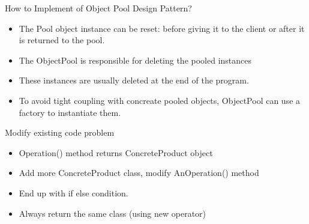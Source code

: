 \documentclass[13pt]{beamer}
\begin{document}
\begin{frame}{How to Implement of Object Pool Design Pattern?}
	\begin{itemize}
		\setlength\itemsep{1em}
		\item The Pool object instance can be reset: before giving it to the client or after it is returned to the pool.
		\item The ObjectPool is responsible for deleting the pooled instances
		\item These instances are usually deleted at the end of the program.
		\item To avoid tight coupling with concreate pooled objects, ObjectPool can use a factory to instantiate them.
	\end{itemize}
\end{frame}

\begin{frame}{Modify existing code problem}
	\begin{center}
	\end{center}
	\begin{itemize}
	\item Operation() method returns ConcreteProduct object
	\item Add more ConcreteProduct class, modify AnOperation() method
	\item End up with if else condition.
	\item Always return the same class (using new operator)
	\end{itemize}
\end{frame}
\end{document}
